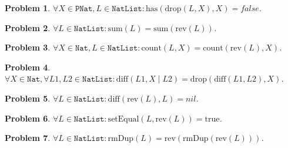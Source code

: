 \documentclass[12pt, a4paper]{article}
\newtheorem{problem}{Problem}
\newcommand{\rel}[1]{\mathrel{#1}}
\newcommand{\rmx}[1]{\mathrm{#1}}
\begin{document}
\begin{problem}
$\forall X \in \mathtt{PNat}, L \in \mathtt{NatList} \colon \rmx{has}(\rmx{drop}(L, X), X) = false$.
\end{problem}

\begin{problem}
$\forall L \in \mathtt{NatList} \colon \rmx{sum}(L) = \rmx{sum}(\rmx{rev}(L))$.
\end{problem}

\begin{problem}
$\forall X \in \mathtt{Nat}, L \in \mathtt{NatList} \colon \rmx{count}(L, X) = \rmx{count}(\rmx{rev}(L), X)$.
\end{problem}

\begin{problem}
$\forall X \in \mathtt{Nat}, \forall L1, L2 \in \mathtt{NatList} \colon \rmx{diff}(L1, X \mid L2) = \rmx{drop}(\rmx{diff}(L1, L2), X)$.
\end{problem}

\begin{problem}
$\forall L \in \mathtt{NatList} \colon \rmx{diff}(\rmx{rev}(L), L) = nil$.
\end{problem}

\begin{problem}
$\forall L \in \mathtt{NatList} \colon \rmx{setEqual}(L, \rmx{rev}(L)) = \rmx{true}$.
\end{problem}

\begin{problem}
$\forall L \in \mathtt{NatList} \colon \rmx{rmDup}(L) = \rmx{rev}(\rmx{rmDup}(\rmx{rev}(L)))$.
\end{problem}


%
%
\end{document}
